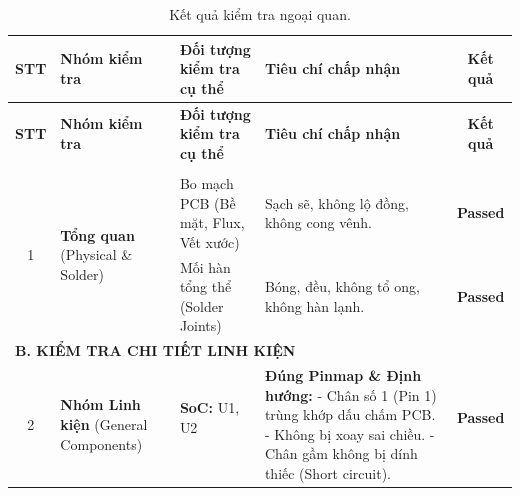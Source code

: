             \begin{longtable}{|c|p{}|p{}|p{}|c|}
                \caption{Kết quả kiểm tra ngoại quan.}
                \label{tab:visual_inspection} \\
                \hline
                \textbf{STT} & \textbf{Nhóm kiểm tra} & \textbf{Đối tượng kiểm tra cụ thể} & \textbf{Tiêu chí chấp nhận} & \textbf{Kết quả} \\ \hline
                \endfirsthead
            
                \hline
                \textbf{STT} & \textbf{Nhóm kiểm tra} & \textbf{Đối tượng kiểm tra cụ thể} & \textbf{Tiêu chí chấp nhận} & \textbf{Kết quả} \\ \hline
                \endhead
            
                \hline
                \endfoot
                \endlastfoot
            
                \multicolumn{5}{|l|}{\textbf{A. KIỂM TRA TỔNG QUÁT}} \\ \hline
            
                \multirow{2}{*}{1} & \multirow{2}{0.15\textwidth}{\textbf{Tổng quan} \newline (Physical \& Solder)}
                    & Bo mạch PCB (Bề mặt, Flux, Vết xước) 
                    & Sạch sẽ, không lộ đồng, không cong vênh. 
                    & \textcolor{modern_blue}{\textbf{Passed}} \\ \cline{3-5}
            
                    & & Mối hàn tổng thể (Solder Joints) 
                    & Bóng, đều, không tổ ong, không hàn lạnh. 
                    & \textcolor{modern_blue}{\textbf{Passed}} \\ \hline
            
                \multicolumn{5}{|l|}{\textbf{B. KIỂM TRA CHI TIẾT LINH KIỆN}} \\ \hline
            
                \multirow{15}{*}{2} & \multirow{15}{0.15\textwidth}{\textbf{Nhóm Linh kiện} \newline (General Components)}
                    & \textbf{SoC:} U1, U2 
                    & \multirow{15}{0.2\textwidth}{\textbf{Đúng Pinmap \& Định hướng:} \newline - Chân số 1 (Pin 1) trùng khớp dấu chấm PCB. \newline - Không bị xoay sai chiều. \newline - Chân gầm không bị dính thiếc (Short circuit).}
                    & \textcolor{modern_blue}{\textbf{Passed}} \\ \cline{3-3} \cline{5-5}
            

\end{longtable}
